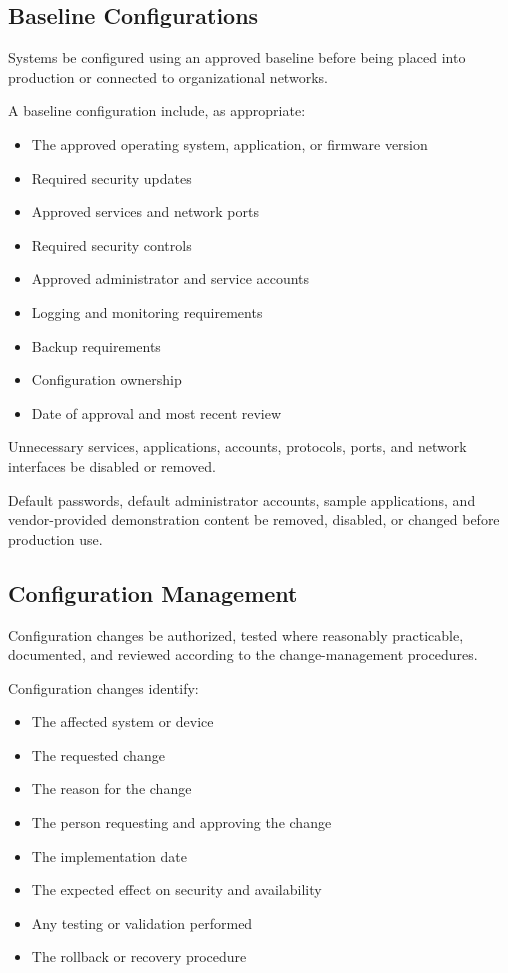 \subsection{Baseline Configurations}

Systems \must{} be configured using an approved baseline before being placed into production or connected to organizational networks.

A baseline configuration \must{} include, as appropriate:
\begin{itemize}
    \item The approved operating system, application, or firmware version
    \item Required security updates
    \item Approved services and network ports
    \item Required security controls
    \item Approved administrator and service accounts
    \item Logging and monitoring requirements
    \item Backup requirements
    \item Configuration ownership
    \item Date of approval and most recent review
\end{itemize}

Unnecessary services, applications, accounts, protocols, ports, and network interfaces \must{} be disabled or removed.

Default passwords, default administrator accounts, sample applications, and vendor-provided demonstration content \must{} be removed, disabled, or changed before production use.

\subsection{Configuration Management}

Configuration changes \must{} be authorized, tested where reasonably practicable, documented, and reviewed according to the change-management procedures.

Configuration changes \must{} identify:
\begin{itemize}
    \item The affected system or device
    \item The requested change
    \item The reason for the change
    \item The person requesting and approving the change
    \item The implementation date
    \item The expected effect on security and availability
    \item Any testing or validation performed
    \item The rollback or recovery procedure
\end{itemize}

